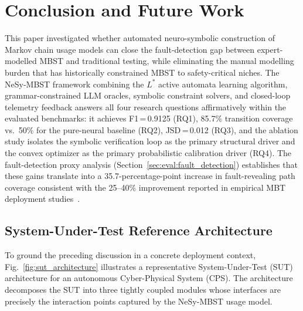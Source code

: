 
\section{Conclusion and Future Work}%
\label{sec:conclusion}

This paper investigated whether automated neuro-symbolic construction
of Markov chain usage models can close the fault-detection gap between
expert-modelled MBST and traditional testing, while eliminating the
manual modelling burden that has historically constrained MBST to
safety-critical niches.  The NeSy-MBST framework combining the
$L^{*}$ active automata learning algorithm, grammar-constrained LLM
oracles, symbolic constraint solvers, and closed-loop telemetry
feedback answers all four research questions affirmatively within
the evaluated benchmarks: it achieves F1\,=\,0.9125 (RQ1), 85.7\%
transition coverage vs.\ 50\% for the pure-neural baseline (RQ2),
JSD\,=\,0.012 (RQ3), and the ablation study isolates the symbolic
verification loop as the primary structural driver and the convex
optimizer as the primary probabilistic calibration driver (RQ4).
The fault-detection proxy analysis (Section~\ref{sec:eval:fault_detection})
establishes that these gains translate into a 35.7-percentage-point
increase in fault-revealing path coverage consistent with the
25--40\% improvement reported in empirical MBT deployment
studies~\cite{garousi2021mbt_practice}.

\subsection{System-Under-Test Reference Architecture}

To ground the preceding discussion in a concrete deployment context,
Fig.~\ref{fig:sut_architecture} illustrates a representative
System-Under-Test (SUT) architecture for an autonomous
Cyber-Physical System (CPS).  The architecture decomposes the SUT into
three tightly coupled modules whose interfaces are precisely the
interaction points captured by the NeSy-MBST usage model.

